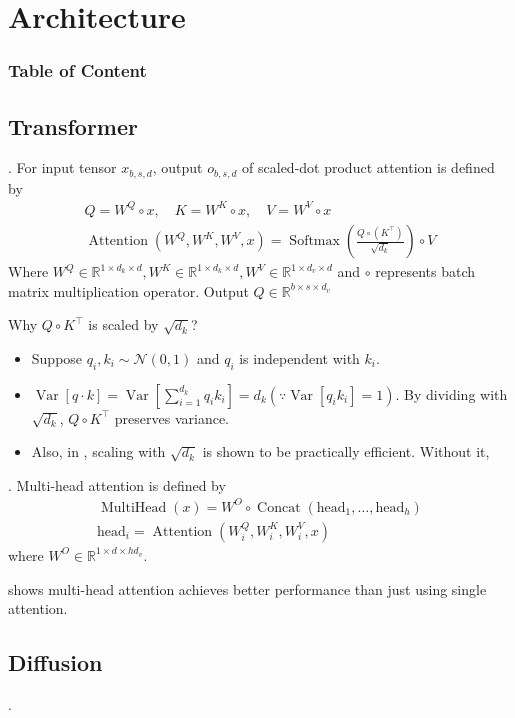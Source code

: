 \documentclass[8pt]{beamer}
\newcommand{\mbb}[1]{\mathbb{#1}}
\newcommand{\mc}[1]{\mathcal{#1}}
\newcommand{\Var}[1]{\operatorname{Var}\left[#1\right]}
\newcommand{\Softmax}[1]{\operatorname{Softmax}\!\left(#1\right)}
\newcommand{\Attention}[1]{\operatorname{Attention}\!\left(#1\right)}
\newcommand{\Concat}[1]{\operatorname{Concat}\!\left(#1\right)}
\begin{document}
\section{Architecture}
\begingroup
    \begin{frame}
        \frametitle{Table of Content}
        \tableofcontents
    \end{frame}
\endgroup
\subsection{Transformer}


\begin{frame}{.}
    For input tensor $x_{b,s,d}$, output $o_{b,s,d}$ of scaled-dot product attention is defined by 
    \[
    \begin{gathered}
        Q = W^Q \circ x, \quad K = W^K \circ x,\quad V = W^V \circ x \\
        \Attention{W^Q, W^K, W^V, x} = \Softmax{\frac{Q \circ (K^\top)}{\sqrt{d_k}}} \circ V
    \end{gathered}
    \]
    Where $W^Q \in \mbb{R}^{1 \times d_k \times d}, W^K \in \mbb{R}^{1 \times d_k \times d}, W^V \in \mbb{R}^{1\times d_v \times d}$ and $\circ$ represents batch matrix multiplication operator. Output $Q \in \mbb{R}^{b\times s \times d_v}$

    \bigskip
    Why $Q \circ K^\top$ is scaled by $\sqrt{d_k}$?
    \begin{itemize}
        \item Suppose $q_i, k_i \sim \mc{N}(0,1)$ and $q_i$ is independent with $k_i$.
        \item $\Var{q \cdot k} = \Var{\sum_{i=1}^{d_k} q_i k_i} = d_k (\because \Var{q_i k_i}=1)$. By dividing with $\sqrt{d_k}$, $Q\circ K^\top$ preserves variance.
        \item Also, in \cite{vaswani2017attention}, scaling with $\sqrt{d_k}$ is shown to be practically efficient. Without it, 
    \end{itemize}
\end{frame}

\begin{frame}{.}
    Multi-head attention is defined by 
    \[
    \begin{gathered}
        \operatorname{MultiHead}(x) = W^O \circ \Concat{\text{head}_1, \dots, \text{head}_h} \\
        \text{head}_i = \Attention{W^Q_i, W^K_i, W^V_i, x}
    \end{gathered}
    \]
    where $W^O \in \mbb{R}^{1 \times d\times hd_v}$.

    \cite{vaswani2017attention} shows multi-head attention achieves better performance than just using single attention.
\end{frame}

\subsection{Diffusion}

\begin{frame}{.}

\end{frame}
\end{document}
